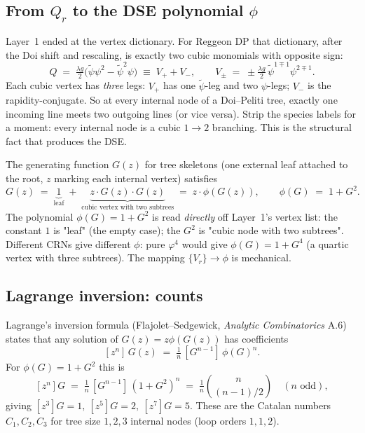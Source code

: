\documentclass[11pt,a4paper]{article}
\begin{document}
\subsection{From $Q_r$ to the DSE polynomial $\phi$}

Layer~1 ended at the vertex dictionary. For Reggeon DP that dictionary, after
the Doi shift and rescaling, is exactly two cubic monomials with opposite
sign:
\[
Q \;=\; \tfrac{\lambda g}{2}\bigl(\tilde\psi\psi^2 - \tilde\psi^2\psi\bigr)
\;\equiv\; V_+ + V_-,
\qquad
V_\pm \;=\; \pm \tfrac{\lambda g}{2}\,\tilde\psi^{1\mp 1}\psi^{2\mp 1}.
\]
Each cubic vertex has \emph{three} legs: $V_+$ has one $\tilde\psi$-leg and
two $\psi$-legs; $V_-$ is the rapidity-conjugate. So at every internal node
of a Doi--Peliti tree, exactly one incoming line meets two outgoing lines
(or vice versa). Strip the species labels for a moment: every internal node
is a cubic $1\!\to\!2$ branching. This is the structural fact that produces
the DSE.

The generating function $G(z)$ for tree skeletons (one external leaf attached
to the root, $z$ marking each internal vertex) satisfies
\[
G(z) \;=\; \underbrace{1}_{\text{leaf}} \;+\; \underbrace{z\cdot G(z)\cdot G(z)}_{\text{cubic vertex with two subtrees}}
\;=\; z\cdot \phi(G(z)), \qquad \phi(G) \;=\; 1 + G^2.
\]
The polynomial $\phi(G)=1+G^2$ is read \emph{directly} off Layer~1's vertex
list: the constant $1$ is "leaf" (the empty case); the $G^2$ is "cubic node
with two subtrees". Different CRNs give different $\phi$: pure $\varphi^4$
would give $\phi(G)=1+G^4$ (a quartic vertex with three subtrees). The
mapping $\{V_r\} \to \phi$ is mechanical.


\subsection{Lagrange inversion: counts}

Lagrange's inversion formula (Flajolet--Sedgewick, \emph{Analytic Combinatorics}
A.6) states that any solution of $G(z)=z\phi(G(z))$ has coefficients
\[
[z^n]\,G(z) \;=\; \tfrac{1}{n}\,[G^{n-1}]\,\phi(G)^n.
\]
For $\phi(G)=1+G^2$ this is
\[
[z^n]G \;=\; \tfrac{1}{n}\,[G^{n-1}]\,(1+G^2)^n
\;=\; \tfrac{1}{n}\binom{n}{(n-1)/2} \quad (n\text{ odd}),
\]
giving $[z^3]G=1,\ [z^5]G=2,\ [z^7]G=5$. These are the Catalan numbers
$C_1, C_2, C_3$ for tree size $1,2,3$ internal nodes (loop orders $1,1,2$).
\end{document}
